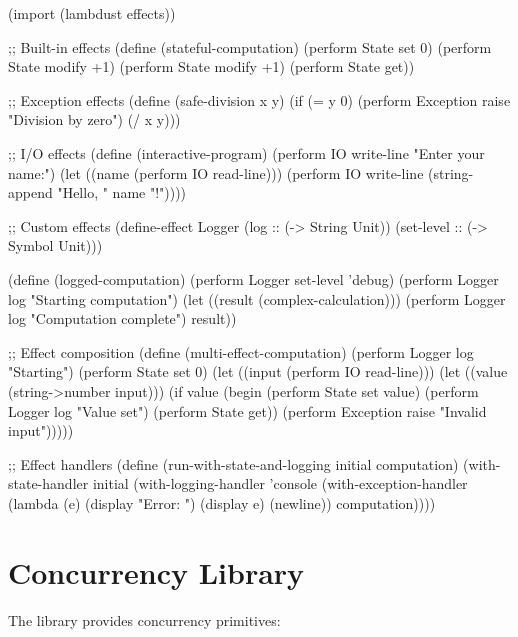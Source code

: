 \begin{example}
\begin{lambdustcode}
(import (lambdust effects))

;; Built-in effects
(define (stateful-computation)
  (perform State set 0)
  (perform State modify +1)
  (perform State modify +1)
  (perform State get))

;; Exception effects  
(define (safe-division x y)
  (if (= y 0)
      (perform Exception raise "Division by zero")
      (/ x y)))

;; I/O effects
(define (interactive-program)
  (perform IO write-line "Enter your name:")
  (let ((name (perform IO read-line)))
    (perform IO write-line (string-append "Hello, " name "!"))))

;; Custom effects
(define-effect Logger
  (log :: (-> String Unit))
  (set-level :: (-> Symbol Unit)))

(define (logged-computation)
  (perform Logger set-level 'debug)
  (perform Logger log "Starting computation")
  (let ((result (complex-calculation)))
    (perform Logger log "Computation complete")
    result))

;; Effect composition
(define (multi-effect-computation)
  (perform Logger log "Starting")
  (perform State set 0)
  (let ((input (perform IO read-line)))
    (let ((value (string->number input)))
      (if value
          (begin
            (perform State set value)
            (perform Logger log "Value set")
            (perform State get))
          (perform Exception raise "Invalid input")))))

;; Effect handlers
(define (run-with-state-and-logging initial computation)
  (with-state-handler initial
    (with-logging-handler 'console
      (with-exception-handler
        (lambda (e) (display "Error: ") (display e) (newline))
        computation))))
\end{lambdustcode}
\end{example}

\section{Concurrency Library}
\label{sec:concurrency-library}


The  library provides concurrency primitives:

